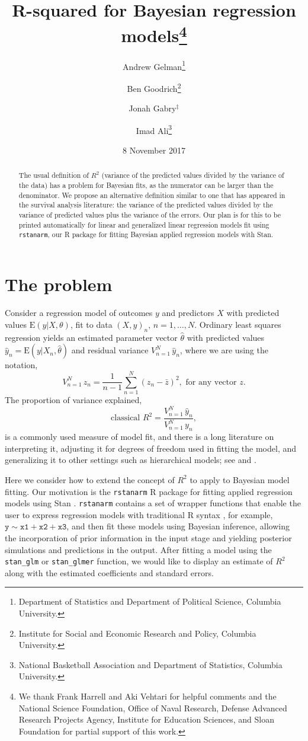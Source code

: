 \documentclass[11pt]{article}
\title{\bf R-squared for Bayesian regression models\footnote{
  We thank Frank Harrell and Aki Vehtari for helpful comments and the National Science Foundation,
  Office of Naval Research, Defense Advanced Research Projects Agency, Institute for Education Sciences, 
  and Sloan Foundation for partial support of this work.
}\vspace{.1in}}
\author{Andrew Gelman\footnote{Department of Statistics and Department of Political Science, Columbia University.}
  \and Ben Goodrich\footnote{Institute for Social and Economic Research and Policy, Columbia University.}
  \and Jonah Gabry$^\ddagger$
  \and Imad Ali\footnote{National Basketball Association and Department of Statistics, Columbia University.
}\vspace{.1in}}
\date{8 November 2017\vspace{-.1in}}
\begin{document}
\sloppy
\maketitle
\thispagestyle{empty}

\begin{abstract}
The usual definition of $R^2$ (variance of the predicted values divided by the
variance of the data) has a problem for Bayesian fits, as the numerator can be
larger than the denominator.  We propose an alternative definition similar to
one that has appeared in the survival analysis literature:  the variance of the
predicted values divided by the variance of predicted values plus the variance 
of the errors. Our plan is for this to be printed automatically for linear and
generalized linear regression models fit using {\tt rstanarm}, our R package
for fitting Bayesian applied regression models with Stan.
\end{abstract}

\section{The problem}

Consider a regression model of outcomes $y$ and predictors $X$ with predicted
values $\mbox{E}(y|X,\theta)$, fit to data $(X,y)_n, \, n=1,\ldots,N$.  Ordinary
least squares regression yields an estimated parameter vector $\hat{\theta}$
with predicted values $\hat{y}_n = \mbox{E}(y | X_n, \hat{\theta})$ and residual
variance $V_{n=1}^N \,\hat{y}_n$, where we are using the notation,
%
$$
V_{n=1}^N \, z_n = \frac{1}{n-1}\sum_{n=1}^N (z_n - \bar{z})^2, \mbox{ for any vector }z.
$$
%
The proportion of variance explained,
%
\begin{equation}\label{rsq1}
\mbox{classical } R^2 = \frac{V_{n=1}^N \,\hat{y}_n}{V_{n=1}^N \,y_n},
\end{equation}
%
is a commonly used measure of model fit, and there is a long literature on
interpreting it, adjusting it for degrees of freedom used in fitting the model,
and generalizing it to other settings such as hierarchical models; see \cite{Xu2003}
and \cite{GelmanPardoe2006}.

Here we consider how to extend the concept of $R^2$ to apply to Bayesian model
fitting.  Our motivation is the {\tt rstanarm} R package
\citep{rstanarmRpackage} for fitting applied regression models using Stan
\citep{stan}. {\tt rstanarm} contains a set of wrapper functions that enable the
user to express regression models with traditional R syntax \citep{rcore}, 
for example, $\mathtt{y \sim x1 + x2 + x3}$, and then fit these models using 
Bayesian inference, allowing the incorporation of prior information in the 
input stage and yielding posterior simulations and
predictions in the output.  After fitting a model using the \verb#stan_glm#
or \verb#stan_glmer# function, we would like to display an estimate of $R^2$
along with the estimated coefficients and standard errors.
\end{document}

